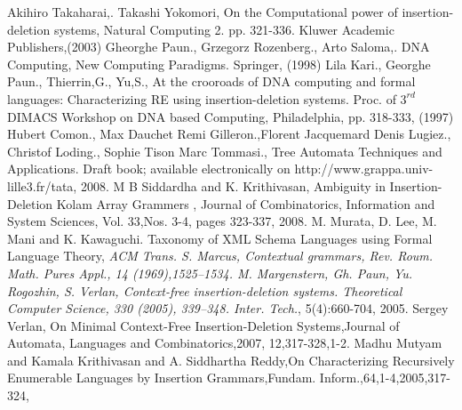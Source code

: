 {%
\begin{thebibliography}{99}\setlength{\itemsep}{-2mm}
	 Akihiro Takaharai,. Takashi Yokomori, On the Computational power of insertion-deletion systems, Natural
			Computing 2. pp. 321-336. Kluwer Academic Publishers,(2003)
	 Gheorghe Paun., Grzegorz Rozenberg., Arto Saloma,. DNA Computing, New Computing Paradigms. Springer, (1998)	
	 Lila Kari., Georghe Paun., Thierrin,G., Yu,S., At the crooroads of DNA computing and formal languages: Characterizing
			RE using insertion-deletion systems. Proc. of $3^{rd}$ DIMACS Workshop on DNA based Computing, Philadelphia, pp. 318-333, (1997)
	 Hubert Comon., Max Dauchet Remi Gilleron.,Florent Jacquemard Denis Lugiez., Christof Loding., Sophie Tison Marc Tommasi., 
			Tree Automata Techniques and Applications. Draft book; available electronically on http://www.grappa.univ-lille3.fr/tata, 2008.
	 M B Siddardha and K. Krithivasan, Ambiguity in Insertion-Deletion Kolam Array Grammers ,
			Journal of Combinatorics, Information and System Sciences, Vol. 33,Nos. 3-4, pages 323-337, 2008.
	M. Murata, D. Lee, M. Mani and K. Kawaguchi. Taxonomy of XML Schema Languages using Formal Language Theory, \emph{ACM Trans.
	S. Marcus, Contextual grammars, Rev. Roum. Math. Pures Appl., 14 (1969),1525–1534.
	 M. Margenstern, Gh. Paun, Yu. Rogozhin, S. Verlan, Context-free insertion-deletion systems. Theoretical Computer Science, 
			330 (2005), 339–348. Inter. Tech.}, 5(4):660-704, 2005.
	Sergey Verlan, On Minimal Context-Free Insertion-Deletion Systems,Journal of Automata, Languages and Combinatorics,2007,
			12,317-328,1-2.
	Madhu Mutyam and Kamala Krithivasan and A. Siddhartha Reddy,On Characterizing Recursively Enumerable Languages by Insertion
               	Grammars,Fundam. Inform.,64,1-4,2005,317-324,

\end{thebibliography}
}
\newpage



